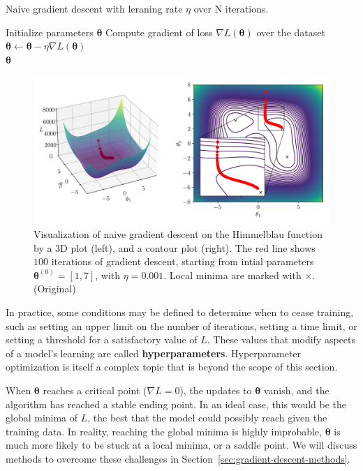 \documentclass[12pt]{report}
\theoremstyle{definition}
\theoremstyle{remark}
\begin{document}
\begin{algorithm}
    \caption{Naive gradient descent with leraning rate $\eta$ over N iterations.}\label{alg:naive-gd}
    \begin{algorithmic}[1]
        \State Initialize parameters $\boldsymbol{\theta}$
            \State Compute gradient of loss $\nabla L(\boldsymbol{\theta})$ over the dataset
            \State $\boldsymbol{\theta} \leftarrow \boldsymbol{\theta} - \eta \nabla L(\boldsymbol{\theta})$
        \EndFor \\
        \Return $\boldsymbol{\theta}$
    \end{algorithmic}
\end{algorithm}
\begin{figure}[h]
    \centering
    \includegraphics[width=\linewidth]{figs/gradient_descent.png}
    \caption{Visualization of naive gradient descent on the Himmelblau function \cite{jamil_literature_2013} by a 3D plot (left), and a contour plot (right). The red line shows $100$ iterations of gradient descent, starting from intial parameters $\boldsymbol{\theta}^{(0)} = [1,7]$, with $\eta = 0.001$. Local minima are marked with $\times$. (Original)}
    \label{fig:enter-label}
\end{figure}

In practice, some conditions may be defined to determine when to cease training, such as setting an upper limit on the number of iterations, setting a time limit, or setting a threshold for a satisfactory value of $L$. These values that modify aspects of a model's learning are called \textbf{\glspl{hyperparameter}}. Hyperparameter optimization is itself a complex topic that is beyond the scope of this section.

When $\boldsymbol{\theta}$ reaches a critical point ($\nabla L = 0$), the updates to $\boldsymbol{\theta}$ vanish, and the algorithm has reached a stable ending point. In an ideal case, this would be the global minima of $L$, the best that the model could possibly reach given the training data. In reality, reaching the global minima is highly improbable, $\boldsymbol{\theta}$ is much more likely to be stuck at a local minima, or a saddle point. We will discuss methods to overcome these challenges in Section~\ref{sec:gradient-descent-methods}.
\end{document}
